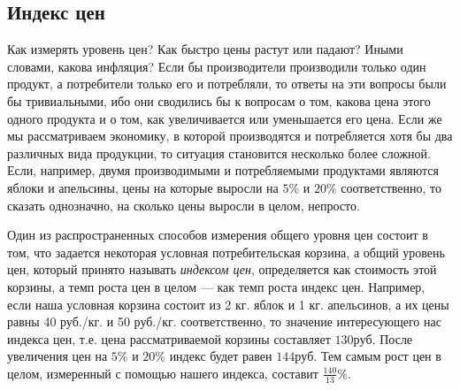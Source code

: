 






























\subsection{Индекс цен}


    Как измерять уровень цен? Как быстро цены растут или падают?
    Иными словами, какова инфляция?
    Если бы производители производили только
    один продукт, а потребители только его и потребляли, то ответы
    на эти вопросы были бы тривиальными, ибо
    они сводились бы к вопросам о том, какова цена этого одного
    продукта и о том, как увеличивается или уменьшается его цена.
    Если же мы рассматриваем экономику, в которой производятся и
    потребляется хотя бы два различных вида продукции, то ситуация
    становится несколько более сложной. Если, например, двумя
    производимыми и потребляемыми продуктами являются яблоки и
    апельсины, цены на которые выросли на $5\%$ и $20\%$
    соответственно, то сказать однозначно, на сколько  цены
    выросли в целом, непросто.

    Один из распространенных способов измерения общего уровня цен
    состоит в том, что задается некоторая условная потребительская
    корзина, а общий уровень цен, который принято называть \emph{индексом цен},
    определяется как стоимость этой
    корзины, а темп роста цен в целом --- как темп роста индекс цен.
    Например, если наша условная корзина состоит из
    2 кг. яблок и 1 кг. апельсинов, а их цены равны 40 руб./кг. и 50
    руб./кг. соответственно, то значение интересующего нас индекса цен, т.е.
    цена рассматриваемой корзины составляет $130 руб.$ После
    увеличения цен на $5\%$ и $20\%$  индекс будет равен $144
    руб.$ Тем самым рост цен в целом, измеренный с помощью нашего индекса,
    составит $\frac{140}{13}\%$.

